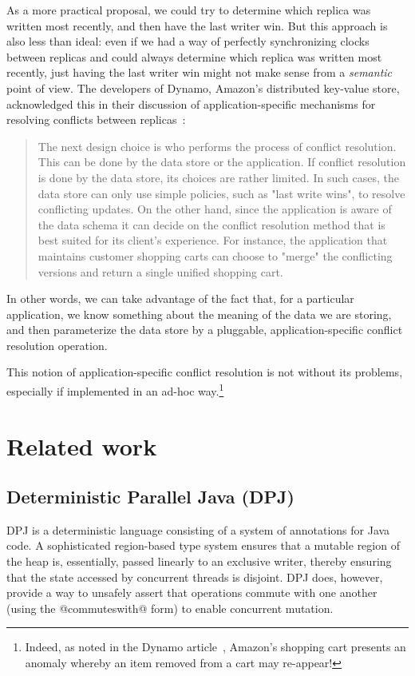 \documentclass{article}
\begin{document}
As a more practical proposal, we could try to determine which replica
was written most recently, and then have the last writer win.  But
this approach is also less than ideal: even if we had a way of
perfectly synchronizing clocks between replicas and could always
determine which replica was written most recently, just having the
last writer win might not make sense from a \emph{semantic} point of
view.  The developers of Dynamo, Amazon's distributed key-value store,
acknowledged this in their discussion of application-specific
mechanisms for resolving conflicts between replicas~\cite{dynamo}:
\begin{quote}
  The next design choice is who performs the process of conflict
  resolution. This can be done by the data store or the
  application. If conflict resolution is done by the data store, its
  choices are rather limited. In such cases, the data store can only
  use simple policies, such as "last write wins", to resolve
  conflicting updates. On the other hand, since the application is
  aware of the data schema it can decide on the conflict resolution
  method that is best suited for its client’s experience. For
  instance, the application that maintains customer shopping carts can
  choose to "merge" the conflicting versions and return a single
  unified shopping cart.
\end{quote}
In other words, we can take advantage of the fact that, for a
particular application, we know something about the meaning of the
data we are storing, and then parameterize the data store by a
pluggable, application-specific conflict resolution operation.

This notion of application-specific conflict resolution is not without
its problems, especially if implemented in an ad-hoc
way.\footnote{Indeed, as noted in the Dynamo article~\cite{dynamo},
  Amazon's shopping cart presents an anomaly whereby an item removed
  from a cart may re-appear!}


\section{Related work}\label{s:related}

\subsection{Deterministic Parallel Java (DPJ)}

DPJ \cite{dpj-oopsla, dpj-hotpar09} is a deterministic language
consisting of a system of annotations for Java code.  A sophisticated
region-based type system ensures that a mutable region of the heap is,
essentially, passed linearly to an exclusive writer, thereby ensuring
that the state accessed by concurrent threads is disjoint.  DPJ does,
however, provide a way to unsafely assert that operations commute with
one another (using the @commuteswith@ form) to enable concurrent
mutation.
\end{document}

